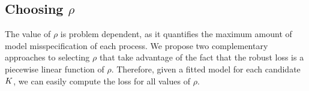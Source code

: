 

%


\subsection{Choosing $\rho$} \label{sec:choosing-rho}

The value of $\rho$ is problem dependent, as it quantifies the maximum amount of model misspecification of each process.
We propose two complementary approaches to selecting $\rho$ that
take advantage of the fact that the robust loss is a piecewise linear function of $\rho$.
Therefore, given a fitted model for each candidate $K$, we can easily compute the loss for all values of $\rho$.

